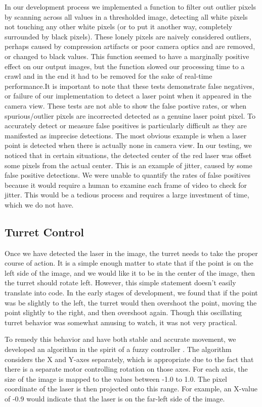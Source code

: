 \documentclass[10pt,twocolumn,letterpaper]{article}
\begin{document}
In our development process we implemented a function to filter out outlier pixels by scanning across all values in a thresholded image, detecting all white pixels not touching any other white pixels (or to put it another way, completely surrounded by black pixels).  These lonely pixels are naively considered outliers, perhaps caused by compression artifacts or poor camera optics and are removed, or changed to black values.  This function seemed to have a marginally positive effect on our output images, but the function slowed our processing time to a crawl and in the end it had to be removed for the sake of real-time performance.It is important to note that these tests demonstrate false negatives, or failure of our implementation to detect a laser point when it appeared in the camera view.  These tests are not able to show the false postive rates, or when spurious/outlier pixels are incorrected detected as a genuine laser point pixel.  To accurately detect or measure false positives is particularly difficult as they are manifested as imprecise detections.  The most obvious example is when a laser point is detected when there is actually none in camera view.  In our testing, we noticed that in certain situations, the detected center of the red laser was offset some pixels from the actual center.  This is an example of jitter, caused by some false positive detections.  We were unable to quantify the rates of false positives because it would require a human to examine each frame of video to check for jitter.  This would be a tedious process and requires a large investment of time, which we do not have.

\subsection{Turret Control}

Once we have detected the laser in the image, the turret needs to take the proper course of action. It is a simple enough matter to state that if the point is on the left side of the image, and we would like it to be in the center of the image, then the turret should rotate left. However, this simple statement doesn't easily translate into code.  In the early stages of development, we found that if the point was be slightly to the left, the turret would then overshoot the point, moving the point slightly to the right, and then overshoot again. Though this oscillating turret behavior was somewhat amusing to watch, it was not very practical.

To remedy this behavior and have both stable and accurate movement, we developed an algorithm in the spirit of a fuzzy controller \cite{jantzen98Logic}. The algorithm considers the X and Y-axes separately, which is appropriate due to the fact that there is a separate motor controlling rotation on those axes. For each axis, the size of the image is mapped to the values between -1.0 to 1.0. The pixel coordinate of the laser is then projected onto this range. For example, an X-value of -0.9 would indicate that the laser is on the far-left side of the image.
\end{document}
